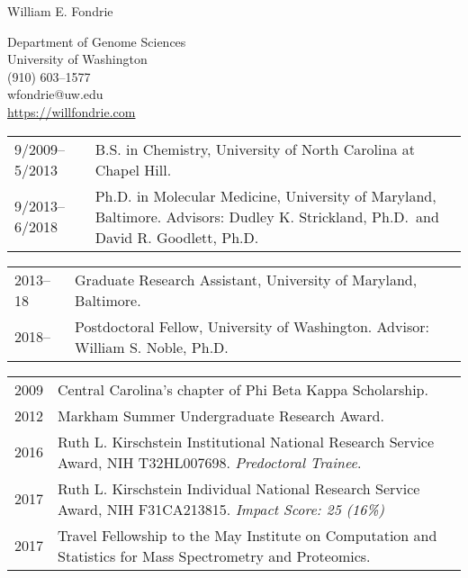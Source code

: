\documentclass{article}
\newcommand{\mysection}[1]{\vspace{1ex}{\bf #1}}
\begin{document}
\begin{center}
  {\Large William E. Fondrie}

  Department of Genome Sciences\\
  University of Washington\\
  (910) 603--1577\\
  wfondrie@uw.edu \\
  \url{https://willfondrie.com}
\end{center}

\mysection{Education}

\begin{tabular}{p{1in}p{4.75in}}
  9/2009--5/2013 & B.S. in Chemistry, University of North Carolina at Chapel Hill.\\
  9/2013--6/2018 & Ph.D. in Molecular Medicine, University of Maryland, Baltimore. \newline Advisors: Dudley K. Strickland, Ph.D.\ and David R. Goodlett, Ph.D.\\
\end{tabular}

\mysection{Employment and Professional Appointments}

\begin{tabular}{p{0.5in}p{5.75in}}
  2013--18 & Graduate Research Assistant, University of Maryland, Baltimore.\\
  2018--   & Postdoctoral Fellow, University of Washington. \newline Advisor: William S. Noble, Ph.D.\\
\end{tabular}

\mysection{Awards}

\begin{tabular}{p{0.5in}p{5.75in}}
  2009 & Central Carolina's chapter of Phi Beta Kappa Scholarship.\\
  2012 & Markham Summer Undergraduate Research Award.\\
  2016 & Ruth L. Kirschstein Institutional National Research Service Award, NIH T32HL007698. \newline \textit{Predoctoral Trainee}.\\
  2017 & Ruth L. Kirschstein Individual National Research Service Award, NIH F31CA213815. \newline \textit{Impact Score: 25 (16\%)}\\
  2017 & Travel Fellowship to the May Institute on Computation and Statistics for Mass Spectrometry and Proteomics.\\
\end{tabular}
\end{document}
